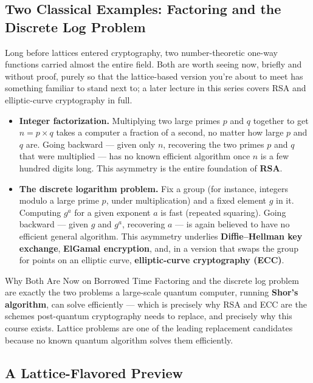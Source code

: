 \subsection{Two Classical Examples: Factoring and the Discrete Log Problem}
\label{sec:L2:two-classical-examples-factoring-and-disc}

Long before lattices entered cryptography, two number-theoretic one-way functions carried almost the entire field. Both are worth seeing now, briefly and without proof, purely so that the lattice-based version you're about to meet has something familiar to stand next to; a later lecture in this series covers RSA and elliptic-curve cryptography in full.

\begin{itemize}[leftmargin=*]
  \item \textbf{Integer factorization.} Multiplying two large primes $p$ and $q$ together to get $n = p \times q$ takes a computer a fraction of a second, no matter how large $p$ and $q$ are. Going backward --- given only $n$, recovering the two primes $p$ and $q$ that were multiplied --- has no known efficient algorithm once $n$ is a few hundred digits long. This asymmetry is the entire foundation of \textbf{RSA}.
  \item \textbf{The discrete logarithm problem.} Fix a group (for instance, integers modulo a large prime $p$, under multiplication) and a fixed element $g$ in it. Computing $g^a$ for a given exponent $a$ is fast (repeated squaring). Going backward --- given $g$ and $g^a$, recovering $a$ --- is again believed to have no efficient general algorithm. This asymmetry underlies \textbf{Diffie--Hellman key exchange}, \textbf{ElGamal encryption}, and, in a version that swaps the group for points on an elliptic curve, \textbf{elliptic-curve cryptography (ECC)}.
\end{itemize}

\begin{rmkbox}{Why Both Are Now on Borrowed Time}
Factoring and the discrete log problem are exactly the two problems a large-scale quantum computer, running \textbf{Shor's algorithm}, can solve efficiently --- which is precisely why RSA and ECC are the schemes post-quantum cryptography needs to replace, and precisely why this course exists. Lattice problems are one of the leading replacement candidates because no known quantum algorithm solves them efficiently.
\end{rmkbox}

\subsection{A Lattice-Flavored Preview}
\label{sec:L2:a-lattice-flavored-preview}

